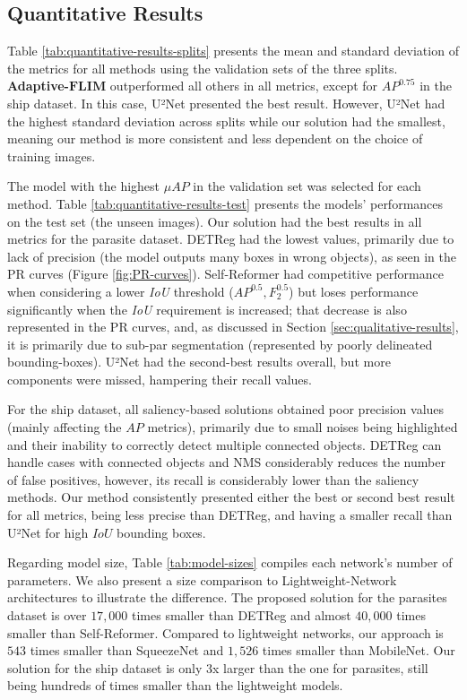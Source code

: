 \documentclass[10pt,twocolumn,twoside]{IEEEtran}
\begin{document}
\subsection{Quantitative Results}\label{subsec:quantitative}
    Table \ref{tab:quantitative-results-splits} presents the mean and standard deviation of the metrics for all methods using the validation sets of the three splits. \textbf{Adaptive-}$\mathbf{FLIM}$ outperformed all others in all metrics, except for $AP^{0.75}$ in the ship dataset. In this case, U²Net presented the best result. However, U²Net had the highest standard deviation across splits while our solution had the smallest, meaning our method is more consistent and less dependent on the choice of training images.

    The model with the highest $\mu AP$ in the validation set was selected for each method. Table \ref{tab:quantitative-results-test} presents the models' performances on the test set (the unseen images). Our solution had the best results in all metrics for the parasite dataset. DETReg had the lowest values, primarily due to lack of precision (the model outputs many boxes in wrong objects), as seen in the PR curves (Figure \ref{fig:PR-curves}). Self-Reformer had competitive performance when considering a lower \textit{IoU} threshold ($AP^{0.5}, F^{0.5}_2$) but loses performance significantly when the \textit{IoU} requirement is increased; that decrease is also represented in the PR curves, and, as discussed in Section \ref{sec:qualitative-results}, it is primarily due to sub-par segmentation (represented by poorly delineated bounding-boxes). U²Net had the second-best results overall, but more components were missed, hampering their recall values. 
    
    For the ship dataset, all saliency-based solutions obtained poor precision values (mainly affecting the $AP$ metrics), primarily due to small noises being highlighted and their inability to correctly detect multiple connected objects. DETReg can handle cases with connected objects and NMS considerably reduces the number of false positives, however, its recall is considerably lower than the saliency methods. Our method consistently presented either the best or second best result for all metrics, being less precise than DETReg, and having a smaller recall than U²Net for high $IoU$ bounding boxes.
    
    Regarding model size, Table \ref{tab:model-sizes} compiles each network's number of parameters. We also present a size comparison to Lightweight-Network architectures to illustrate the difference. The proposed solution for the parasites dataset is over $17,000$ times smaller than DETReg and almost $40,000$ times smaller than Self-Reformer. Compared to lightweight networks, our approach is $543$ times smaller than SqueezeNet and $1,526$ times smaller than MobileNet. Our solution for the ship dataset is only 3x larger than the one for parasites, still being hundreds of times smaller than the lightweight models.
    
\end{document}
